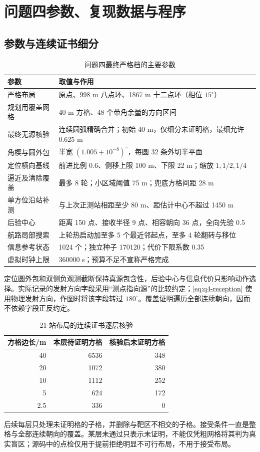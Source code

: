 \clearpage
\section{问题四参数、复现数据与程序}\label{app:q4repro}
\subsection{参数与连续证书细分}
\begin{table}[H]\centering
\caption{问题四最终严格档的主要参数}
\begin{tabular}{@{}p{}p{}@{}}\toprule
参数 & 取值与作用\\\midrule
严格布局 & 原点、998 m 八点环、1867 m 十二点环（相位 $15^\circ$）\\
规划用覆盖网格 & 40 m 方格、48 个带角余量的方向区间\\
最终无源核验 & 连续圆弧精确合并；初始 40 m，仅细分未证明格，最细允许 0.625 m\\
角楔与圆外包 & 半宽 $(1.005+10^{-8})^\circ$，每圆 32 条外切半平面\\
定位横向基线 & 前进比例 0.6、侧移上限 100 m、下限 22 m；缩放 $1,1/2,1/4$\\
逼近及清除覆盖 & 最多 8 轮；小区域阈值 75 m；兜底方格间距 28 m\\
单方位沿站补测 & 与上次正测站相距至少 80 m、距估计中心不超过 1450 m\\
后验中心 & 距离 150 点、接收半径 9 点、相容朝向 36 点，全向先验 0.5\\
航路局部搜索 & 上轮热启动加至多 5 个最近邻起点，至多 4 轮翻转与移位\\
信息参考状态 & 1024 个；独立种子 170120；代价下限系数 0.35\\
虚拟时钟上限 & 360000 s；预算不足不宣称严格完成\\\bottomrule
\end{tabular}\end{table}

定位圆外包和双侧负观测截断保持真源包含性，后验中心与信息代价只影响动作选择。实际记录的发射方向字段采用“测点指向源”的比较约定；\cref{eq:q4-reception} 使用物理发射方向，作图时将该字段转过 $180^\circ$。覆盖证明遍历全部连续朝向，因而不依赖字段正反约定。

\begin{table}[H]\centering
\caption{21 站布局的连续证书逐层核验}
\begin{tabular}{@{}rrr@{}}\toprule
方格边长/m & 本层待证明方格 & 核验后未证明方格\\\midrule
40 & 6536 & 348\\
20 & 1072 & 380\\
10 & 1112 & 252\\
5 & 624 & 172\\
2.5 & 336 & 0\\\bottomrule
\end{tabular}\end{table}
后续每层只处理未证明格的子格，并删除与靶区不相交的子格。接受条件一直是整格与全部连续朝向的覆盖。某层未通过只表示未证明，不能仅凭粗网格将其判为真实盲区；源码中的点检仅用于提前拒绝明显不可行布局，不用于接受布局。

